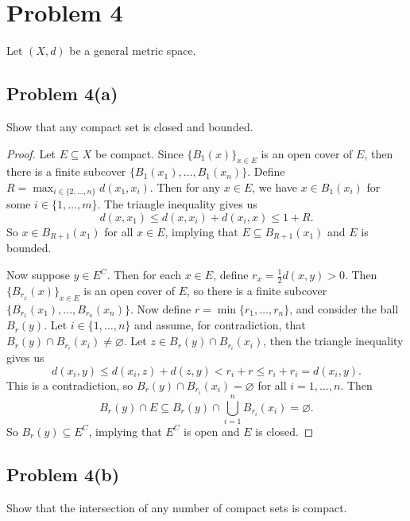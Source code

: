 \documentclass[12pt]{article}
\newenvironment{problem}
    {\begin{lrbox}{\mybox}\begin{minipage}{\textwidth-10pt}}
    {\end{minipage}\end{lrbox}\framebox[6.5in]{\usebox{\mybox}}}
\newcommand{\ds}{\displaystyle}
\newcommand{\<}{\left\langle}
\renewcommand{\>}{\right\rangle}
\let\emptyset\varnothing
\begin{document}
\newpage
\section*{Problem 4}
\begin{problem}
    Let $(X,d)$ be a general metric space.
\end{problem}

\subsection*{Problem 4(a)}
\begin{problem}
    Show that any compact set is closed and bounded.
\end{problem}

\begin{proof}
    Let $E\subseteq X$ be compact. Since $\{B_1(x)\}_{x\in E}$ is an open cover of $E$, then there is a finite subcover $\{B_1(x_1),\dots,B_1(x_n)\}$. Define $R = \ds\max_{i\in\{2,\dots,n\}}d(x_1,x_i)$. Then for any $x\in E$, we have $x\in B_1(x_i)$ for some $i\in\{1,\dots,m\}$. The triangle inequality gives us
    \[d(x,x_1) \leq d(x,x_i) + d(x_i,x) \leq 1 + R.\]
    So $x\in B_{R+1}(x_1)$ for all $x\in E$, implying that $E\subseteq B_{R+1}(x_1)$ and $E$ is bounded.
    
    Now suppose $y\in E^C$. Then for each $x\in E$, define $r_x = \frac12d(x,y) > 0$.  Then $\{B_{r_x}(x)\}_{x\in E}$ is an open cover of $E$, so there is a finite subcover $\{B_{r_1}(x_1),\dots,B_{r_n}(x_n)\}$. Now define $r=\min\{r_1,\dots,r_n\}$, and consider the ball $B_r(y)$. Let $i\in\{1,\dots,n\}$ and assume, for contradiction, that $B_r(y)\cap B_{r_i}(x_i) \ne \emptyset$. Let $z\in B_r(y)\cap B_{r_i}(x_i)$, then the triangle inequality gives us
    \[d(x_i, y) \leq d(x_i,z) + d(z,y) < r_i + r \leq r_i + r_i = d(x_i,y).\]
    This is a contradiction, so $B_r(y)\cap B_{r_i}(x_i) = \emptyset$ for all $i=1,\dots,n$. Then
    \[B_r(y) \cap E \subseteq B_r(y) \cap \bigcup_{i=1}^nB_{r_i}(x_i) = \emptyset.\]
    So $B_r(y)\subseteq E^C$, implying that $E^C$ is open and $E$ is closed.
    
\end{proof}

\newpage
\subsection*{Problem 4(b)}
\begin{problem}
    Show that the intersection of any number of compact sets is compact.
\end{problem}
\end{document}
